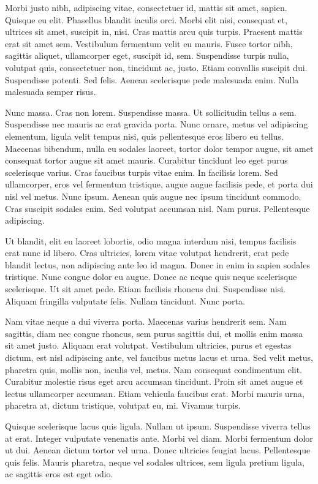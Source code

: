\documentclass[12pt]{article}
\begin{document}
Morbi justo nibh, adipiscing vitae, consectetuer id, mattis sit amet, sapien. Quisque eu elit. Phasellus blandit iaculis orci. Morbi elit nisi, consequat et, ultrices sit amet, suscipit in, nisi. Cras mattis arcu quis turpis. Praesent mattis erat sit amet sem. Vestibulum fermentum velit eu mauris. Fusce tortor nibh, sagittis aliquet, ullamcorper eget, suscipit id, sem. Suspendisse turpis nulla, volutpat quis, consectetuer non, tincidunt ac, justo. Etiam convallis suscipit dui. Suspendisse potenti. Sed felis. Aenean scelerisque pede malesuada enim. Nulla malesuada semper risus.

Nunc massa. Cras non lorem. Suspendisse massa. Ut sollicitudin tellus a sem. Suspendisse nec mauris ac erat gravida porta. Nunc ornare, metus vel adipiscing elementum, ligula velit tempus nisi, quis pellentesque eros libero eu tellus. Maecenas bibendum, nulla eu sodales laoreet, tortor dolor tempor augue, sit amet consequat tortor augue sit amet mauris. Curabitur tincidunt leo eget purus scelerisque varius. Cras faucibus turpis vitae enim. In facilisis lorem. Sed ullamcorper, eros vel fermentum tristique, augue augue facilisis pede, et porta dui nisl vel metus. Nunc ipsum. Aenean quis augue nec ipsum tincidunt commodo. Cras suscipit sodales enim. Sed volutpat accumsan nisl. Nam purus. Pellentesque adipiscing.

Ut blandit, elit eu laoreet lobortis, odio magna interdum nisi, tempus facilisis erat nunc id libero. Cras ultricies, lorem vitae volutpat hendrerit, erat pede blandit lectus, non adipiscing ante leo id magna. Donec in enim in sapien sodales tristique. Nunc congue dolor eu augue. Donec ac neque quis neque scelerisque scelerisque. Ut sit amet pede. Etiam facilisis rhoncus dui. Suspendisse nisi. Aliquam fringilla vulputate felis. Nullam tincidunt. Nunc porta.

Nam vitae neque a dui viverra porta. Maecenas varius hendrerit sem. Nam sagittis, diam nec congue rhoncus, sem purus sagittis dui, et mollis enim massa sit amet justo. Aliquam erat volutpat. Vestibulum ultricies, purus et egestas dictum, est nisl adipiscing ante, vel faucibus metus lacus et urna. Sed velit metus, pharetra quis, mollis non, iaculis vel, metus. Nam consequat condimentum elit. Curabitur molestie risus eget arcu accumsan tincidunt. Proin sit amet augue et lectus ullamcorper accumsan. Etiam vehicula faucibus erat. Morbi mauris urna, pharetra at, dictum tristique, volutpat eu, mi. Vivamus turpis.

Quisque scelerisque lacus quis ligula. Nullam ut ipsum. Suspendisse viverra tellus at erat. Integer vulputate venenatis ante. Morbi vel diam. Morbi fermentum dolor ut dui. Aenean dictum tortor vel urna. Donec ultricies feugiat lacus. Pellentesque quis felis. Mauris pharetra, neque vel sodales ultrices, sem ligula pretium ligula, ac sagittis eros est eget odio.
\end{document}
